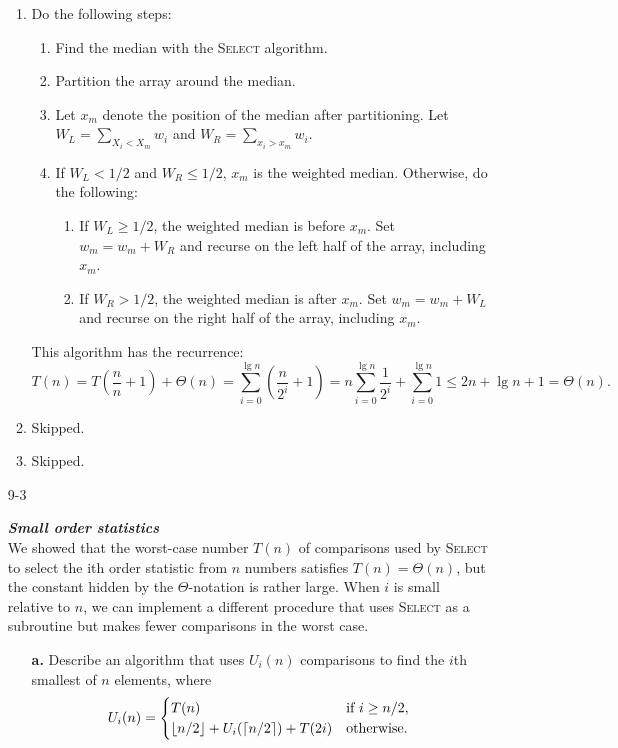 \begin{enumerate}
\begin{framed}
\begin{enumerate}
\item Do the following steps:
\begin{enumerate}
\item Find the median with the \textsc{Select} algorithm.
\item Partition the array around the median.
\item Let $x_m$ denote the position of the median after partitioning. Let
$W_L = \sum_{X_i < X_m} w_i$ and $W_R = \sum_{x_i > x_m} w_i$.
\item If $W_L < 1/2$ and $W_R \le 1/2$, $x_m$ is the weighted median. Otherwise,
do the following:
\begin{enumerate}
\item If $W_L \ge 1/2$, the weighted median is before $x_m$.
Set $w_m = w_m + W_R$ and recurse on the left half of the array, including
$x_m$.
\item If $W_R > 1/2$, the weighted median is after $x_m$. Set $w_m = w_m + W_L$
and recurse on the right half of the array, including $x_m$.
\end{enumerate}
\end{enumerate}

This algorithm has the recurrence:
\[
  T(n) = T\left(\frac{n}{n} + 1\right) + \Theta(n)
       = \sum_{i = 0}^{\lg n} \left(\frac{n}{2^i} + 1\right)
       = n \sum_{i = 0}^{\lg n} \frac{1}{2^i} + \sum_{i = 0}^{\lg n} 1
       \le 2n + \lg n + 1
       = \Theta(n).
\]

\item Skipped.

\item Skipped.

\end{enumerate}
\end{framed}

\newpage

\item[9-3]{\textbf{\emph{Small order statistics}}\\
We showed that the worst-case number $T(n)$ of comparisons used by
\textsc{Select} to select the ith order statistic from $n$ numbers satisfies
$T(n) = \Theta(n)$, but the constant hidden by the $\Theta$-notation is rather
large. When $i$ is small relative to $n$, we can implement a different procedure
that uses \textsc{Select} as a subroutine but makes fewer comparisons in the
worst case.

\begin{enumerate}
\item[\textbf{a.}] Describe an algorithm that uses $U_i(n)$ comparisons to
find the $i$th smallest of $n$ elements, where
\[
U_i(n) =
\begin{cases}
  T(n) & \text{if } i \ge n/2,\\
  \lfloor n/2\rfloor + U_i(\lceil n/2\rceil) + T(2i) & \text{otherwise}.
\end{cases}
\]


\end{enumerate}}
\end{enumerate}
